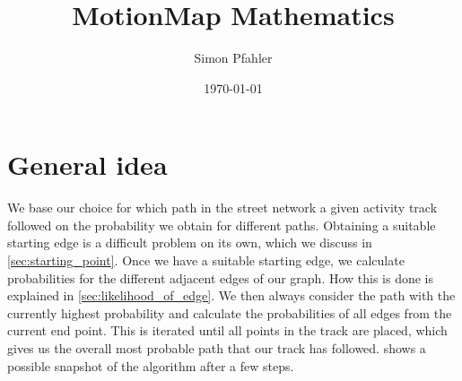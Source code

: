 \documentclass[notitlepage]{scrarticle}
\title{MotionMap Mathematics}
\author{Simon Pfahler}
\date{\today}
\begin{document}
\maketitle
\tableofcontents
\clearpage

\section{General idea}
We base our choice for which path in the street network a given activity track followed on the probability we obtain for different paths.
Obtaining a suitable starting edge is a difficult problem on its own, which we discuss in \cref{sec:starting_point}.
Once we have a suitable starting edge, we calculate probabilities for the different adjacent edges of our graph.
How this is done is explained in \cref{sec:likelihood_of_edge}.
We then always consider the path with the currently highest probability and calculate the probabilities of all edges from the current end point.
This is iterated until all points in the track are placed, which gives us the overall most probable path that our track has followed.
 shows a possible snapshot of the algorithm after a few steps.
\end{document}
